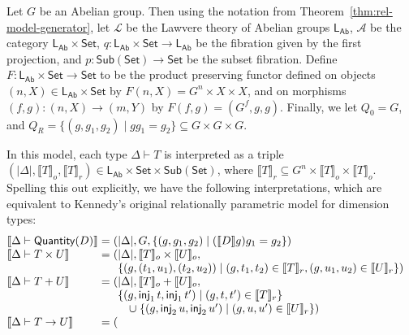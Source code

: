 \documentclass[a4paper,UKenglish]{lipics}
\theoremstyle{plain}
\newcommand{\msf}[1]{\mathsf{#1}} %
\newcommand{\Set}{\msf{Set}}
\newcommand{\Sub}[1]{\msf{Sub}(#1)}
\newcommand{\LAb}{\msf{L}_{\msf{Ab}}}
\newcommand{\A}{\mathcal{A}}
\newcommand{\sem}[1]{\ensuremath{\llbracket #1 \rrbracket}}
\newcommand{\semo}[1]{\ensuremath{\llbracket #1 \rrbracket _o}}
\newcommand{\semr}[1]{\ensuremath{\llbracket #1 \rrbracket _r}}
\newcommand{\qnt}{\msf{Quantity}}
\newcommand{\inj}{\mathsf{inj}}
\begin{document}
\begin{example}\label{ex:relKen}
Let $G$ be an Abelian group. Then using the notation from
Theorem~\ref{thm:rel-model-generator}, let
$\mathcal{L}$ be the Lawvere theory of Abelian groups $\LAb$, $\A$
be the category $\LAb \times \Set$, $q: \LAb \times \Set \rightarrow
\LAb$ be the fibration given by the first projection, and
$p:\Sub{\Set}\rightarrow \Set$ be the subset fibration. Define
$F:\LAb \times \Set \rightarrow \Set$ to be the product preserving
functor defined on objects $(n,X) \in \LAb \times \Set$ by $F(n, X)
= G^{n} \times X \times X$, and on morphisms $(f, g) : (n,X)
\rightarrow (m, Y)$ by $F(f,g) = (G^f, g, g)$. Finally, we let $Q_0
= G$, and $Q_R = \{(g,g_1,g_2) \mathrel| gg_1 = g_2 \} \subseteq G
\times G \times G$.

In this model, each type $\Delta \vdash T$ is interpreted as a triple $(|\Delta|, \semo{T}, \semr{T}) \in \LAb \times \Set \times \Sub{\Set}$, where $\semr{T} \subseteq G^n \times \semo{T} \times \semo{T}$. Spelling this out explicitly, we have the following interpretations, which are equivalent to Kennedy's original relationally parametric model for dimension types:
  \begin{displaymath}
    \begin{array}{@{}l@{\hspace{0.3em}}c@{\hspace{0.3em}}l}
      \sem{\Delta \vdash \qnt(D)} & = & (|\Delta|, G, \{ (g, g_1, g_2) \mathrel| (\sem{D}g)g_1 = g_2 \}) \\
      \sem{\Delta \vdash T \times U} & = &
      (\begin{array}[t]{@{}l}
        |\Delta|, \semo{T} \times \semo{U}, \\
        \{ (g, (t_1,u_1), (t_2,u_2)) \mathrel| (g,t_1,t_2) \in \semr{T}, (g,u_1,u_2) \in \semr{U} \})
      \end{array}
      \\
      \sem{\Delta \vdash T + U} & = &
      (\begin{array}[t]{@{}l}
        |\Delta|, \semo{T} + \semo{U}, \\
        \{ (g, \inj_1\,t,\inj_1\,t') \mathrel| (g,t,t') \in \semr{T} \}\\
        \quad \mathrel\cup
        \{ (g, \inj_2\,u,\inj_2\,u') \mathrel| (g,u,u') \in \semr{U} \})
      \end{array}
      \\
      \sem{\Delta \vdash T \to U} & = &
      (\begin{array}[t]{@{}l}

\end{array}
\end{array}
\end{displaymath}
\end{example}
\end{document}
